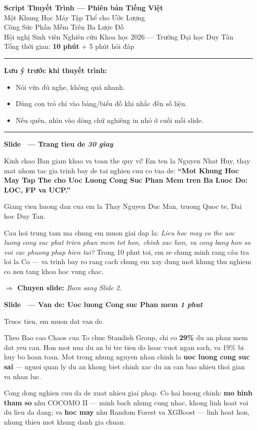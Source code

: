 \documentclass[12pt,a4paper]{article}
\newcounter{slidenum}
\newcommand{\slide}[2]{%
  \stepcounter{slidenum}%
  \vspace{0.6em}
  \begin{mdframed}[backgroundcolor=slideblue!90, linecolor=slideblue,
    leftmargin=0pt, rightmargin=0pt, innerleftmargin=10pt,
    innerrightmargin=10pt, innertopmargin=6pt, innerbottommargin=6pt]
    \color{white}\large\bfseries Slide \theslidenum\ --- #1
    \hfill \textcolor{yellow!80!white}{\normalsize\itshape #2}
  \end{mdframed}
  \vspace{0.3em}
}
\newcommand{\say}[1]{%
  \begin{mdframed}[backgroundcolor=bglight, linecolor=slideblue!40,
    leftmargin=0pt, rightmargin=0pt, innerleftmargin=12pt,
    innerrightmargin=12pt, innertopmargin=8pt, innerbottommargin=8pt,
    linewidth=1.5pt]
  #1
  \end{mdframed}
}
\newcommand{\transition}[1]{%
  \vspace{0.15em}
  \noindent\textcolor{timergreen}{\bfseries $\Rightarrow$ Chuyen slide:} \textit{#1}
  \vspace{0.3em}
}
\begin{document}
\begin{center}
  {\LARGE\bfseries\color{slideblue}
    Script Thuyết Trình --- Phiên bản Tiếng Việt}\\[0.5em]
  {\large Một Khung Học Máy Tập Thể cho Ước Lượng\\
    Công Sức Phần Mềm Trên Ba Lược Đồ}\\[0.4em]
  {\normalsize Hội nghị Sinh viên Nghiên cứu Khoa học 2026 --- Trường Đại học Duy Tân}\\[0.2em]
  {\normalsize\color{timergreen} Tổng thời gian: \textbf{10 phút} + 5 phút hỏi đáp}
\end{center}
\hrule
\vspace{1em}

\noindent\textbf{Lưu ý trước khi thuyết trình:}
\begin{itemize}[leftmargin=1.5em]
  \item Nói vừa đủ nghe, không quá nhanh.
  \item Dùng con trỏ chỉ vào bảng/biểu đồ khi nhắc đến số liệu.
  \item Nếu quên, nhìn vào dòng chữ nghiêng in nhỏ ở cuối mỗi slide.
\end{itemize}

\vspace{0.5em}
\hrule
\vspace{0.5em}

\slide{Trang tieu de}{30 giay}

\say{
Kinh chao Ban giam khao va toan the quy vi! Em ten la Nguyen Nhat Huy, thay mat nhom tac gia trinh bay de tai nghien cuu co tua de: \textbf{``Mot Khung Hoc May Tap The cho Uoc Luong Cong Suc Phan Mem tren Ba Luoc Do: LOC, FP va UCP.''}

Giang vien huong dan cua em la Thay Nguyen Duc Man, truong Quoc te, Dai hoc Duy Tan.

Cau hoi trung tam ma chung em muon giai dap la: \textit{Lieu hoc may co the uoc luong cong suc phat trien phan mem tot hon, chinh xac hon, va cong bang hon so voi cac phuong phap hien tai?} Trong 10 phut toi, em se chung minh rang câu tra loi la Co --- va trinh bay ro rang cach chung em xay dung mot khung thu nghiem co nen tang khoa hoc vung chac.
}

\transition{Bam sang Slide 2.}

\slide{Van de: Uoc luong Cong suc Phan mem}{1 phut}

\say{
Truoc tien, em muon dat van de.

Theo Bao cao Chaos cua To chuc Standish Group, chi co \textbf{29\%} du an phan mem dat yeu cau. Hon mot nua du an bi tre tien do hoac vuot ngan sach, va 19\% bi huy bo hoan toan. Mot trong nhung nguyen nhan chinh la \textbf{uoc luong cong suc sai} --- nguoi quan ly du an khong biet chinh xac du an can bao nhieu thoi gian va nhan luc.

Cong dong nghien cuu da de xuat nhieu giai phap. Co hai huong chinh: \textbf{mo hinh tham so} nhu COCOMO II --- minh bach nhung cung nhac, khong linh hoat voi du lieu da dang; va \textbf{hoc may} nhu Random Forest va XGBoost --- linh hoat hon, nhung thieu mot khung danh gia chuan.
}
\end{document}
